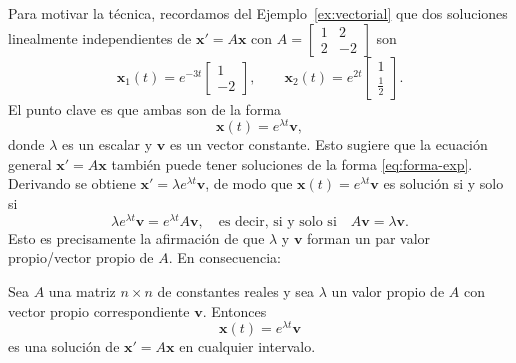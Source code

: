 Para motivar la t\'ecnica, recordamos del Ejemplo~\ref{ex:vectorial} que dos soluciones linealmente independientes de $\mathbf{x}' = A\mathbf{x}$ con $A = \begin{bmatrix} 1 & 2 \\ 2 & -2 \end{bmatrix}$ son
\[
\mathbf{x}_1(t) = e^{-3t}\begin{bmatrix} 1 \\ -2 \end{bmatrix},
\qquad
\mathbf{x}_2(t) = e^{2t}\begin{bmatrix} 1 \\ \frac{1}{2} \end{bmatrix}.
\]
El punto clave es que ambas son de la forma
\begin{equation}\label{eq:forma-exp}
\mathbf{x}(t) = e^{\lambda t}\mathbf{v},
\end{equation}
donde $\lambda$ es un escalar y $\mathbf{v}$ es un vector constante. Esto sugiere que la ecuaci\'on general $\mathbf{x}' = A\mathbf{x}$ tambi\'en puede tener soluciones de la forma \eqref{eq:forma-exp}. Derivando se obtiene $\mathbf{x}' = \lambda e^{\lambda t}\mathbf{v}$, de modo que $\mathbf{x}(t) = e^{\lambda t}\mathbf{v}$ es soluci\'on si y solo si
\[
\lambda e^{\lambda t}\mathbf{v} = e^{\lambda t}A\mathbf{v},
\quad\text{es decir, si y solo si}\quad
A\mathbf{v} = \lambda \mathbf{v}.
\]
Esto es precisamente la afirmaci\'on de que $\lambda$ y $\mathbf{v}$ forman un par valor propio/vector propio de $A$. En consecuencia:

\begin{theorem}\label{thm:autopar}
Sea $A$ una matriz $n \times n$ de constantes reales y sea $\lambda$ un valor propio de $A$ con vector propio correspondiente $\mathbf{v}$. Entonces
\[
\mathbf{x}(t) = e^{\lambda t}\mathbf{v}
\]
es una soluci\'on de $\mathbf{x}' = A\mathbf{x}$ en cualquier intervalo.
\end{theorem}

